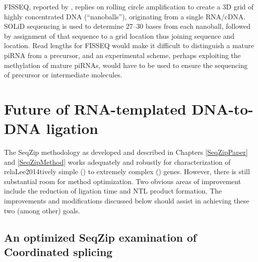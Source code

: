     FISSEQ, reported by \citet{Lee2014a}, replies on rolling circle amplification to create a 3D grid of highly concentrated DNA (``nanoballs''), originating from a single RNA/cDNA. SOLiD sequencing is used to determine 27--30 bases from each nanoball, followed by assignment of that sequence to a grid location thus joining sequence and location. Read lengths for FISSEQ would make it difficult to distinguish a mature piRNA from a precursor, and an experimental scheme, perhaps exploiting the methylation of mature piRNAs, would have to be used to ensure the sequencing of precursor or intermediate molecules.


\section{Future of RNA-templated DNA-to-DNA ligation}
  \label{Disc:sec:SeqZip Improvements}

  The SeqZip methodology as developed and described in Chapters \ref{SeqZipPaper} and \ref{SeqZipMethod} works adequately and robustly for characterization of relaLee2014tively simple (\cd{}) to extremely complex (\dscam{}) genes. However, there is still substantial room for method optimization. Two obvious areas of improvement include the reduction of ligation time and NTL product formation. The improvements and modifications discussed below should assist in achieving these two (among other) goals.

  \subsection{An optimized SeqZip examination of Coordinated splicing}
    \label{Disc:subsec: Ideal SeqZip exp. to look for Coordination}

